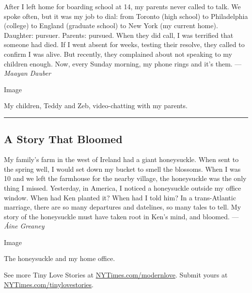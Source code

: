 After I left home for boarding school at 14, my parents never called to
talk. We spoke often, but it was my job to dial: from Toronto (high
school) to Philadelphia (college) to England (graduate school) to New
York (my current home). Daughter: pursuer. Parents: pursued. When they
did call, I was terrified that someone had died. If I went absent for
weeks, testing their resolve, they called to confirm I was alive. But
recently, they complained about not speaking to my children enough. Now,
every Sunday morning, my phone rings and it's them. --- \emph{Maayan
Dauber}

Image

My children, Teddy and Zeb, video-chatting with my parents.

\begin{center}\rule{0.5\linewidth}{\linethickness}\end{center}

\hypertarget{a-story-that-bloomed}{%
\subsection{A Story That Bloomed}\label{a-story-that-bloomed}}

My family's farm in the west of Ireland had a giant honeysuckle. When
sent to the spring well, I would set down my bucket to smell the
blossoms. When I was 10 and we left the farmhouse for the nearby
village, the honeysuckle was the only thing I missed. Yesterday, in
America, I noticed a honeysuckle outside my office window. When had Ken
planted it? When had I told him? In a trans-Atlantic marriage, there are
so many departures and datelines, so many tales to tell. My story of the
honeysuckle must have taken root in Ken's mind, and bloomed. ---
\emph{Áine Greaney}

Image

The honeysuckle and my home office.

See more Tiny Love Stories at
\href{https://www.nytimes3xbfgragh.onion/column/modern-love}{NYTimes.com/modernlove}.
Submit yours at
\href{http://nytimes3xbfgragh.onion/tinylovestories}{NYTimes.com/tinylovestories}.

